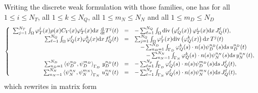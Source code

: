 \documentclass[letterpaper,10pt,english]{sphinxmanual}
\begin{document}
\sphinxAtStartPar
Writing the discrete weak formulation with those families, one has for
all \(1 \le i \le N_T\), all \(1 \le k \le N_Q\), all
\(1 \le m_N \le N_N\) and all \(1 \le m_D \le N_D\)
\begin{equation*}
\begin{split}\left\lbrace
\begin{array}{rcl}
\sum_{j=1}^{N_T} \int_\Omega \varphi_T^j(x) \rho(x) C_V(x) \varphi_T^i(x) {\rm d}x \, \frac{\rm d}{{\rm d}t} T^j(t) &=& - \sum_{\ell=1}^{N_Q} \int_\Omega {\rm div} \left( \varphi_Q^\ell(x) \right) \varphi_T^i(x) {\rm d}x \, J_Q^\ell(t), \\
\sum_{\ell=1}^{N_Q} \int_\Omega \varphi_Q^\ell(x) \varphi_Q^k(x) {\rm d}x \, f_Q^\ell(t) &=& \sum_{j=1}^{N_Q} \int_\Omega \varphi_T^j(x) {\rm div} \left( \varphi_Q^k(x) \right) {\rm d}x \, T^j(t) \\
&& \quad - \sum_{n_D=1}^{N_D} \int_{\Gamma_D} \varphi_Q^k(s) \cdot n(s) \psi_D^{n_D}(s) {\rm d}s \, u_D^{n_D}(t) \\
&& \qquad - \sum_{n_N=1}^{N_N} \int_{\Gamma_N} \varphi_Q^k(s) \cdot n(s) \psi_N^{n_N}(s) {\rm d}s \, y_N^{n_N}(t), \\
\sum_{n_D=1}^{N_D} \left\langle \psi_D^{n_D}, \psi_D^{m_D} \right\rangle_{\Gamma_D} \, y_D^{n_D}(t) &=& - \sum_{\ell=1}^{N_p} \int_{\Gamma_D} \varphi_Q^\ell(s) \cdot n(s) \psi_D^{m_D}(s) {\rm d}s \, J_Q^\ell(t), \\
\sum_{n_N=1}^{N_N} \left\langle \psi_N^{n_N}, \psi_N^{m_N} \right\rangle_{\Gamma_N} \, u_N^{n_N}(t) &=& - \sum_{\ell=1}^{N_p} \int_{\Gamma_N} \varphi_Q^\ell(s) \cdot n(s) \psi_N^{m_N}(s) {\rm d}s \, J_Q^\ell(t),
\end{array}
\right.\end{split}
\end{equation*}
\sphinxAtStartPar
which rewrites in matrix form
\end{document}
